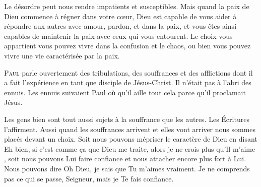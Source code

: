 Le désordre peut nous rendre impatients et susceptibles.
 Mais quand la paix de Dieu commence à régner dans votre c\oe{}ur,
 Dieu est capable de vous aider à répondre aux autres avec amour,
 pardon, et dans la paix, et vous êtes ainsi capables de maintenir
 la paix avec ceux qui vous entourent.
 Le choix vous appartient \ocadr vous pouvez vivre dans la confusion et le chaos,
 ou bien vous pouvez vivre une vie caractérisée par la paix.

\dvrule







\lettrine{P}{aul} parle ouvertement des tribulations,
 des souffrances et des afflictions dont il a fait
 l'expérience en tant que disciple de Jésus-Christ.
 Il n'était pas à l'abri des ennuis.
 Les ennuis suivaient Paul où qu'il aille
 \ocadr tout cela parce qu'il proclamait Jésus.


Les \Og gens bien \Fg{} sont tout aussi sujets
 à la souffrance que les autres.
 Les Écritures l'affirment.
 Aussi quand les souffrances arrivent
 \ocadr et elles vont arriver \fcadr{}
 nous sommes placés devant un choix.
 Soit nous pouvons mépriser le caractère de Dieu
 en disant\frcolon{} 
 \Og Eh bien, si c'est comme \c{c}a que Dieu me traite,
 alors je ne crois plus qu'Il m'aime \Fg{},
 soit nous pouvons Lui faire confiance et nous attacher
 encore plus fort à Lui.
 Nous pouvons dire\frcolon{} 
 \Og Oh Dieu, je sais que Tu m'aimes vraiment.
 Je ne comprends pas ce qui se passe, Seigneur,
 mais je Te fais confiance. \Fg{}


